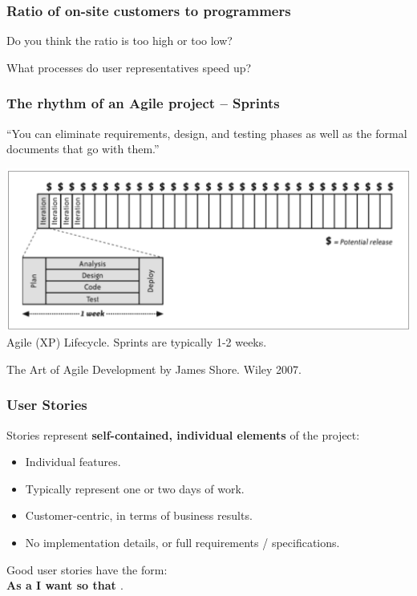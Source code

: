 \documentclass{beamer} %
\newcommand\emc[1]{\textcolor{midred}{\textbf{#1}}}
\begin{document}
\begin{frame}
\frametitle{Ratio of on-site customers to programmers}

Do you think the ratio is too high or too low?

\vspace{5mm}
What processes do user representatives speed up?

\end{frame}



\begin{frame}
\frametitle{The rhythm of an Agile project -- Sprints}

``You can eliminate requirements, design, and testing phases as well as the formal documents that go with them.''

\begin{center}
\includegraphics[scale=0.35]{assets/agile} \\
Agile (XP) Lifecycle. Sprints are typically 1-2 weeks.
\end{center}

{\small The Art of Agile Development by James Shore. Wiley 2007.}

\end{frame}


\begin{frame}

\frametitle{User Stories}

Stories represent \emc{self-contained, individual elements} of the project: 
\begin{itemize}
\item Individual features.
\item Typically represent one or two days of work.
\item Customer-centric, in terms of business results.
\item No implementation details, or full requirements / specifications.
\end{itemize}

\vspace{5mm}
Good user stories have the form: \\ \emc{As a {\em <type of user>} I want {\em <some goal>} so that {\em <some reason>}}.

\end{frame}
\end{document}
